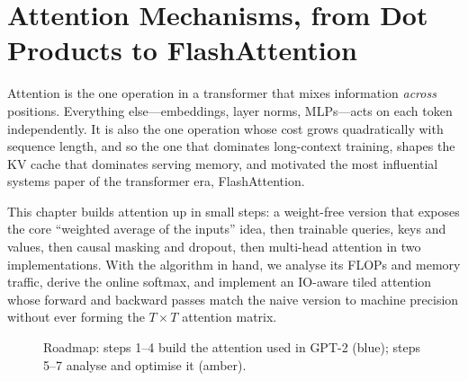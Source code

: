 \chapter{Attention Mechanisms, from Dot Products to FlashAttention}\label{ch:attention}

Attention is the one operation in a transformer that mixes information \emph{across} positions.
Everything else---embeddings, layer norms, MLPs---acts on each token independently. It is also the
one operation whose cost grows quadratically with sequence length, and so the one that dominates
long-context training, shapes the KV cache that dominates serving memory, and motivated the most
influential systems paper of the transformer era, FlashAttention.

This chapter builds attention up in small steps: a weight-free version that exposes the core
``weighted average of the inputs'' idea, then trainable queries, keys and values, then causal
masking and dropout, then multi-head attention in two implementations. With the algorithm in
hand, we analyse its FLOPs and memory traffic, derive the online softmax, and implement an
IO-aware tiled attention whose forward and backward passes match the naive version to machine
precision without ever forming the $T\times T$ attention matrix.

\begin{figure}[t]
\centering
{}
\caption{Roadmap: steps 1--4 build the attention used in GPT-2 (blue); steps 5--7 analyse and
optimise it (amber).}
\label{fig:attention:roadmap}
\end{figure}

